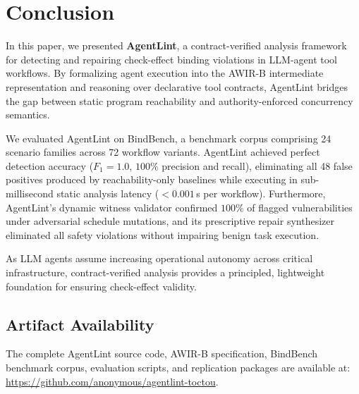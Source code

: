 \section{Conclusion}
\label{sec:conclusion}

In this paper, we presented \textbf{AgentLint}, a contract-verified analysis framework for detecting and repairing check-effect binding violations in LLM-agent tool workflows. By formalizing agent execution into the \textsf{AWIR-B} intermediate representation and reasoning over declarative tool contracts, AgentLint bridges the gap between static program reachability and authority-enforced concurrency semantics.

We evaluated AgentLint on \textsf{BindBench}, a benchmark corpus comprising 24 scenario families across 72 workflow variants. AgentLint achieved perfect detection accuracy ($F_1 = 1.0$, $100\%$ precision and recall), eliminating all 48 false positives produced by reachability-only baselines while executing in sub-millisecond static analysis latency ($< 0.001$\,s per workflow). Furthermore, AgentLint's dynamic witness validator confirmed $100\%$ of flagged vulnerabilities under adversarial schedule mutations, and its prescriptive repair synthesizer eliminated all safety violations without impairing benign task execution.

As LLM agents assume increasing operational autonomy across critical infrastructure, contract-verified analysis provides a principled, lightweight foundation for ensuring check-effect validity.

\subsection*{Artifact Availability}
The complete AgentLint source code, \textsf{AWIR-B} specification, \textsf{BindBench} benchmark corpus, evaluation scripts, and replication packages are available at: \url{https://github.com/anonymous/agentlint-toctou}.
